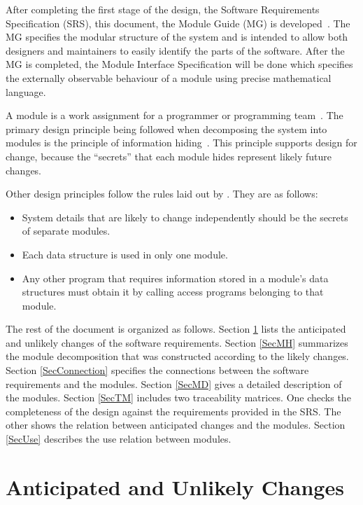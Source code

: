 \documentclass[12pt, titlepage]{article}
\begin{document}
After completing the first stage of the design, the Software Requirements Specification (SRS), this document, the Module Guide (MG) is developed~\citep{ParnasEtAl1984}. The MG
specifies the modular structure of the system and is intended to allow both
designers and maintainers to easily identify the parts of the software. After the MG is completed, the Module Interface Specification will be done which specifies the externally observable behaviour of a module using precise mathematical language.

A module is a work assignment for a programmer or programming team~\citep{ParnasEtAl1984}. The primary design principle being followed when decomposing the system into modules is the principle of information hiding~\citep{Parnas1972a}. This principle supports design for change, because the ``secrets'' that each module hides represent likely future changes.

Other design principles follow the rules laid out by \citet{ParnasEtAl1984}. They are as follows:
\begin{itemize}
\item System details that are likely to change independently should be the
  secrets of separate modules.
\item Each data structure is used in only one module.
\item Any other program that requires information stored in a module's data
  structures must obtain it by calling access programs belonging to that module.
\end{itemize}

The rest of the document is organized as follows. Section
\ref{SecChange} lists the anticipated and unlikely changes of the software
requirements. Section \ref{SecMH} summarizes the module decomposition that
was constructed according to the likely changes. Section \ref{SecConnection}
specifies the connections between the software requirements and the
modules. Section \ref{SecMD} gives a detailed description of the
modules. Section \ref{SecTM} includes two traceability matrices. One checks
the completeness of the design against the requirements provided in the SRS. The
other shows the relation between anticipated changes and the modules. Section
\ref{SecUse} describes the use relation between modules.

\section{Anticipated and Unlikely Changes} \label{SecChange}
\end{document}
